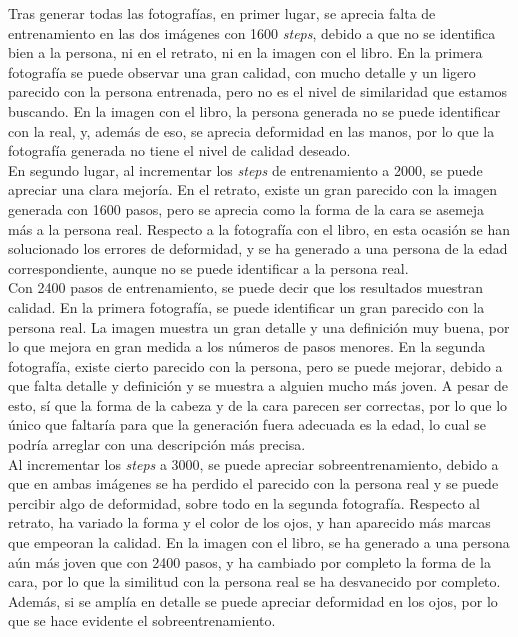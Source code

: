 Tras generar todas las fotografías, en primer lugar, se aprecia falta de entrenamiento en las dos imágenes con 1600 \textit{steps}, debido a que no se identifica bien a la persona, ni en el retrato, ni en la imagen con el libro. En la primera fotografía se puede observar una gran calidad, con mucho detalle y un ligero parecido con la persona entrenada, pero no es el nivel de similaridad que estamos buscando. En la imagen con el libro, la persona generada no se puede identificar con la real, y, además de eso, se aprecia deformidad en las manos, por lo que la fotografía generada no tiene el nivel de calidad deseado. \\

En segundo lugar, al incrementar los \textit{steps} de entrenamiento a 2000, se puede apreciar una clara mejoría. En el retrato, existe un gran parecido con la imagen generada con 1600 pasos, pero se aprecia como la forma de la cara se asemeja más a la persona real. Respecto a la fotografía con el libro, en esta ocasión se han solucionado los errores de deformidad, y se ha generado a una persona de la edad correspondiente, aunque no se puede identificar a la persona real.\\

Con 2400 pasos de entrenamiento, se puede decir que los resultados muestran calidad. En la primera fotografía, se puede identificar un gran parecido con la persona real. La imagen muestra un gran detalle y una definición muy buena, por lo que mejora en gran medida a los números de pasos menores. En la segunda fotografía, existe cierto parecido con la persona, pero se puede mejorar, debido a que falta detalle y definición y se muestra a alguien mucho más joven. A pesar de esto, sí que la forma de la cabeza y de la cara parecen ser correctas, por lo que lo único que faltaría para que la generación fuera adecuada es la edad, lo cual se podría arreglar con una descripción más precisa.\\

Al incrementar los \textit{steps} a 3000, se puede apreciar sobreentrenamiento, debido a que en ambas imágenes se ha perdido el parecido con la persona real y se puede percibir algo de deformidad, sobre todo en la segunda fotografía. Respecto al retrato, ha variado la forma y el color de los ojos, y han aparecido más marcas que empeoran la calidad. En la imagen con el libro, se ha generado a una persona aún más joven que con 2400 pasos, y ha cambiado por completo la forma de la cara, por lo que la similitud con la persona real se ha desvanecido por completo. Además, si se amplía en detalle se puede apreciar deformidad en los ojos, por lo que se hace evidente el sobreentrenamiento. \\

